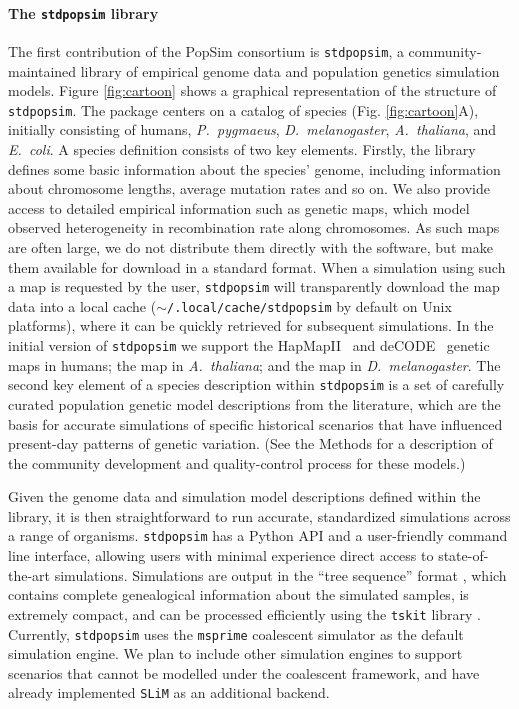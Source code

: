 \documentclass[12pt,halfline,a4paper]{ouparticle}
\newcommand{\stdpopsim}{\texttt{stdpopsim}\xspace}
\newcommand{\tskit}{\texttt{tskit}\xspace}
\begin{document}
\paragraph{The \stdpopsim library}
The first contribution of the PopSim consortium is \stdpopsim, a
community-maintained library of empirical genome data and population genetics simulation
models. Figure \ref{fig:cartoon} shows a graphical
representation of the structure of \stdpopsim. The package centers
on a catalog of species (Fig. \ref{fig:cartoon}A), initially consisting of humans, \emph{P.~pygmaeus},
\emph{D.~melanogaster}, \emph{A.~thaliana}, and \emph{E.~coli}.
A species definition consists of two key elements.  Firstly, the library defines
some basic information about the species' genome, including information about chromosome
lengths, average mutation rates and so on. We also provide access to detailed
empirical information such as genetic maps, which model observed
heterogeneity in recombination rate along chromosomes. As such maps are often large,
we do not distribute them directly with the software, but make them available
for download in a standard format. When a simulation using such a map is
requested by the user, \stdpopsim will transparently download the map
data into a local cache (\texttt{$\sim$/.local/cache/stdpopsim} by default
on Unix platforms), where it can be quickly retrieved for subsequent
simulations.
In the initial version of \stdpopsim we support
the HapMapII~\citep{international2007second} and
deCODE~\citep{kong2010fine} genetic maps in humans;
the \cite{salome2011recombination} map in \emph{A.~thaliana};
and the \cite{comeron2012many} map in \emph{D.~melanogaster}.
The second key element of a species description
within \stdpopsim is a set of carefully curated population genetic model
descriptions from the literature, which are the basis for accurate simulations
of specific historical scenarios that have influenced present-day patterns of
genetic variation. (See the Methods for a description of the community
development and quality-control process for these models.)

Given the genome data and simulation model descriptions defined within the
library, it is then straightforward to run accurate, standardized simulations
across a range of organisms. \stdpopsim has a Python API and a user-friendly
command line interface, allowing users with minimal experience direct access to
state-of-the-art simulations. Simulations are output in the ``tree sequence''
format \citep{kelleher2016efficient,kelleher2018efficient,kelleher2019inferring}, which
contains complete genealogical information about the simulated samples, is
extremely compact, and can be processed efficiently using the \tskit library
\citep{kelleher2016efficient,kelleher2018efficient}. Currently,
\stdpopsim uses the  \texttt{msprime} coalescent simulator \citep{kelleher2016efficient}
as the default simulation engine. We plan to include other simulation
engines to support scenarios that cannot be modelled under the coalescent framework,
and have already implemented \texttt{SLiM} \citep{haller2019tree,haller2019slim} as
an additional backend.
\end{document}
